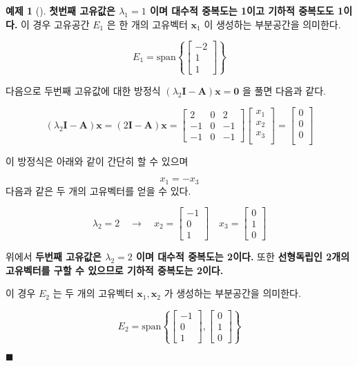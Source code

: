 \documentclass[
  11pt,
  a4paper,
  oneside]{scrbook}
\theoremstyle{definition}
\newtheorem{exercise}{예제}[chapter]
\theoremstyle{plain}
\theoremstyle{definition}
\theoremstyle{definition}
\theoremstyle{remark}
\begin{document}
\begin{exercise}[]
\textbf{첫번째 고유값은 \(\lambda_1=1\) 이며 대수적 중복도는 1이고
기하적 중복도도 1이다.} 이 경우 고유공간 \(E_1\) 은 한 개의 고유벡터
\(\pmb x_1\) 이 생성하는 부분공간을 의미한다.

\[
E_1 = \text{span}\left\{\begin{bmatrix}-2 \\ 1 \\ 1\end{bmatrix} \right\}
\]

다음으로 두번째 고유값에 대한 방정식
\((\lambda_2 \pmb I -\pmb A )\pmb x = \pmb 0\) 을 풀면 다음과 같다.

\[
(\lambda_2 \pmb I -\pmb A )\pmb x= (2\pmb I -\pmb A )\pmb x =
\begin{bmatrix}
2 & 0 & 2 \\
-1 & 0 & -1 \\
-1 & 0 & -1
\end{bmatrix}
\begin{bmatrix}
x_1 \\
x_2 \\
x_3 \\
\end{bmatrix}
=
\begin{bmatrix}
0 \\
0 \\
0 \\
\end{bmatrix}
\]

이 방정식은 아래와 같이 간단히 할 수 있으며

\[ x_1 = -x_3 \] 다음과 같은 두 개의 고유벡터를 얻을 수 있다.

\[ 
\lambda_2=2\quad \rightarrow \quad  x_2=\begin{bmatrix}-1 \\ 0 \\ 1\end{bmatrix} 
\quad x_3=\begin{bmatrix}0 \\ 1 \\ 0\end{bmatrix} 
\]

위에서 \textbf{두번째 고유값은 \(\lambda_2=2\) 이며 대수적 중복도는
2이다.} 또한 \textbf{선형독립인 2개의 고유벡터를 구할 수 있으므로 기하적
중복도는 2이다.}

이 경우 \(E_2\) 는 두 개의 고유벡터 \(\pmb x_1, \pmb x_2\) 가 생성하는
부분공간을 의미한다.

\[
E_2 = \text{span}\left\{\begin{bmatrix}-1 \\ 0 \\ 1\end{bmatrix}, \begin{bmatrix}0 \\ 1 \\ 0\end{bmatrix}\right\}
\]

\(\blacksquare\)

\end{exercise}
\end{document}
